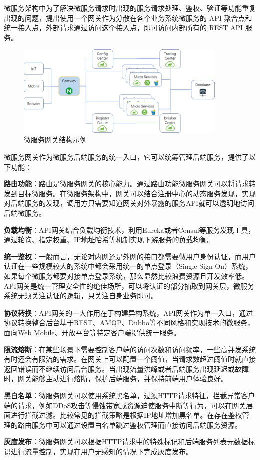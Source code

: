 微服务架构中为了解决微服务请求时出现的服务请求处理、鉴权、验证等功能重复出现的问题，提出使用一个网关作为分散在各个业务系统微服务的 API 聚合点和统一接入点，外部请求通过访问这个接入点，即可访问内部所有的 REST API 服务。

\begin{figure}[H]
    \centering
    \includegraphics[width=0.9\textwidth]{Img/api 网关.png}
    \caption{微服务网关结构示例}
    \label{fig:api_gateway}
\end{figure}

微服务网关作为微服务后端服务的统一入口，它可以统筹管理后端服务，提供了以下功能：\par

\textbf{路由功能}：路由是微服务网关的核心能力。通过路由功能微服务网关可以将请求转发到目标微服务。在微服务架构中，网关可以结合注册中心的动态服务发现，实现对后端服务的发现，调用方只需要知道网关对外暴露的服务API就可以透明地访问后端微服务。\par
\textbf{负载均衡}：API网关结合负载均衡技术，利用Eureka或者Consul等服务发现工具，通过轮询、指定权重、IP地址哈希等机制实现下游服务的负载均衡。\par
\textbf{统一鉴权}：一般而言，无论对内网还是外网的接口都需要做用户身份认证，而用户认证在一些规模较大的系统中都会采用统一的单点登录（Single Sign On）系统，如果每个微服务都要对接单点登录系统，那么显然比较浪费资源且开发效率低。API网关是统一管理安全性的绝佳场所，可以将认证的部分抽取到网关层，微服务系统无须关注认证的逻辑，只关注自身业务即可。\par
\textbf{协议转换}：API网关的一大作用在于构建异构系统，API网关作为单一入口，通过协议转换整合后台基于REST、AMQP、Dubbo等不同风格和实现技术的微服务，面向Web Mobile、开放平台等特定客户端提供统一服务。\par
\textbf{限流熔断}：在某些场景下需要控制客户端的访问次数和访问频率，一些高并发系统有时还会有限流的需求。在网关上可以配置一个阈值，当请求数超过阈值时就直接返回错误而不继续访问后台服务。当出现流量洪峰或者后端服务出现延迟或故障时，网关能够主动进行熔断，保护后端服务，并保持前端用户体验良好。\par
\textbf{黑白名单}：微服务网关可以使用系统黑名单，过滤HTTP请求特征，拦截异常客户端的请求，例如DDoS攻击等侵蚀带宽或资源迫使服务中断等行为，可以在网关层面进行拦截过滤。比较常见的拦截策略是根据IP地址增加黑名单。在存在鉴权管理的路由服务中可以通过设置白名单跳过鉴权管理而直接访问后端服务资源。\par
\textbf{灰度发布}：微服务网关可以根据HTTP请求中的特殊标记和后端服务列表元数据标识进行流量控制，实现在用户无感知的情况下完成灰度发布。\par

